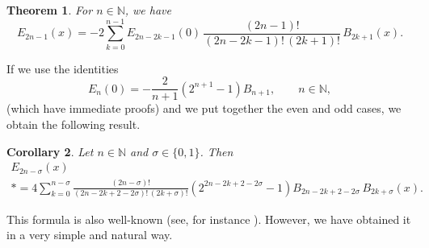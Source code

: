 \documentclass[a4paper,reqno]{amsart}
\newcommand{\N}{\mathbb{N}}
\theoremstyle{plain}
\newtheorem{Teor}{Theorem}[section]
\newtheorem{Cor}[Teor]{Corollary}
\numberwithin{equation}{section}
\theoremstyle{remark}
\begin{document}
\begin{Teor} 
For $n\in\N$, we have
\[
  E_{2n-1}(x) = -2 \sum_{k=0}^{n-1} E_{2n-2k-1}(0) \, \frac{(2n-1)!}{(2n-2k-1)!\,(2k+1)!}\,B_{2k+1}(x).
\]
\end{Teor}

If we use the identities
\[
  E_n(0) = -\frac{2}{n+1} (2^{n+1}-1) B_{n+1}, \qquad n\in\N,
\]
(which have immediate proofs) and we put together the even and odd cases, we obtain the following result.

\begin{Cor} 
Let $n\in\N$ and $\sigma\in\{0,1\}$. Then
\begin{multline}
\label{bereul}
  E_{2n-\sigma}(x)
  \\*
  = 4 \sum_{k=0}^{n-\sigma} \frac{(2n-\sigma)!}{(2n-2k+2-2\sigma)!\,(2k+\sigma)!} 
  (2^{2n-2k+2-2\sigma}-1) B_{2n-2k+2-2\sigma}\,B_{2k+\sigma}(x).
\end{multline}
\end{Cor}

This formula is also well-known (see, for instance \cite[formula 23.1.28, p.~806]{AS}). However, we have obtained it in a very simple and natural way.
\end{document}
